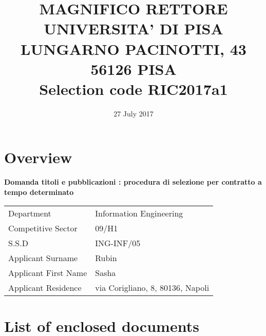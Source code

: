 \documentclass{article}
\title{MAGNIFICO RETTORE\\
UNIVERSITA' DI PISA\\
LUNGARNO PACINOTTI, 43\\
56126 PISA\\
Selection code RIC2017a1\\
}
\date{27 July 2017}
\begin{document}
\maketitle
\tableofcontents

\newpage

{\center \section{Overview}}


\def\apptitle{Domanda titoli e pubblicazioni :  procedura di selezione per contratto a tempo determinato}
\def\selectioncode{A11}

\textbf{\apptitle}

\vspace{1cm}

\begin{tabular}{ l  l }
Department \dotfill & Information Engineering \\
Competitive Sector \dotfill &   09/H1\\
S.S.D \dotfill &  ING-INF/05\\
Applicant Surname \dotfill & Rubin \\
Applicant First Name \dotfill & Sasha\\
Applicant Residence \dotfill &  via Corigliano, 8, 80136, Napoli\\
\end{tabular}



% 

{\center \section{List of enclosed documents}}
\end{document}
